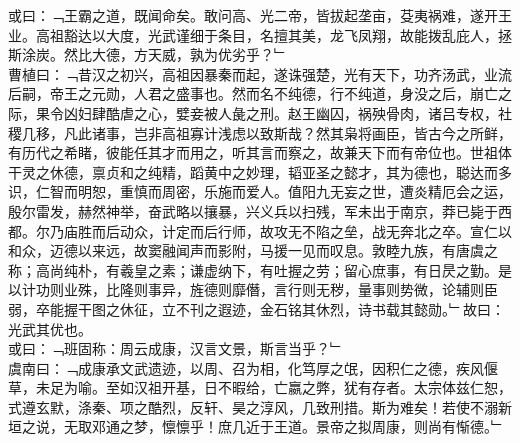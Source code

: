 或曰：﹁王霸之道，既闻命矣。敢问高、光二帝，皆拔起垄亩，芟夷祸难，遂开王业。高祖豁达以大度，光武谨细于条目，名擅其美，龙飞凤翔，故能拨乱庇人，拯斯涂炭。然比大德，方天威，孰为优劣乎？﹂\\
曹植曰：﹁昔汉之初兴，高祖因暴秦而起，遂诛强楚，光有天下，功齐汤武，业流后嗣，帝王之元勋，人君之盛事也。然而名不纯德，行不纯道，身没之后，崩亡之际，果令凶妇肆酷虐之心，嬖妾被人彘之刑。赵王幽囚，祸殃骨肉，诸吕专权，社稷几移，凡此诸事，岂非高祖寡计浅虑以致斯哉？然其枭将画臣，皆古今之所鲜，有历代之希睹，彼能任其才而用之，听其言而察之，故兼天下而有帝位也。世祖体干灵之休德，禀贞和之纯精，蹈黄中之妙理，韬亚圣之懿才，其为德也，聪达而多识，仁智而明恕，重慎而周密，乐施而爱人。值阳九无妄之世，遭炎精厄会之运，殷尔雷发，赫然神举，奋武略以攘暴，兴义兵以扫残，军未出于南京，莽已毙于西都。尔乃庙胜而后动众，计定而后行师，故攻无不陷之垒，战无奔北之卒。宣仁以和众，迈德以来远，故窦融闻声而影附，马援一见而叹息。敦睦九族，有唐虞之称；高尚纯朴，有羲皇之素；谦虚纳下，有吐握之劳；留心庶事，有日昃之勤。是以计功则业殊，比隆则事异，旌德则靡僭，言行则无秽，量事则势微，论辅则臣弱，卒能握干图之休征，立不刊之遐迹，金石铭其休烈，诗书载其懿勋。﹂故曰：光武其优也。
\\
或曰：﹁班固称：周云成康，汉言文景，斯言当乎？﹂\\
虞南曰：﹁成康承文武遗迹，以周、召为相，化笃厚之氓，因积仁之德，疾风偃草，未足为喻。至如汉祖开基，日不暇给，亡嬴之弊，犹有存者。太宗体兹仁恕，式遵玄默，涤秦、项之酷烈，反轩、昊之淳风，几致刑措。斯为难矣！若使不溺新垣之说，无取邓通之梦，懔懔乎！庶几近于王道。景帝之拟周康，则尚有惭德。﹂
